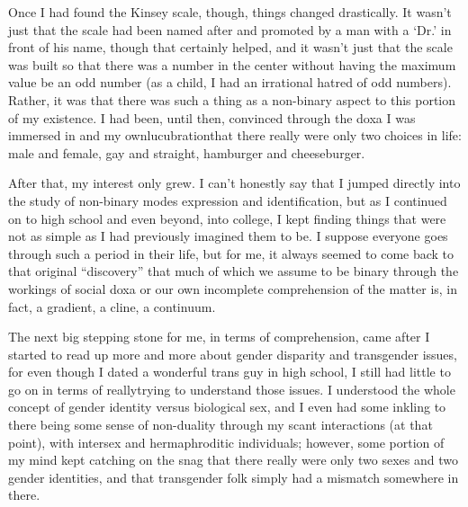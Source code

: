 Once I had found the Kinsey scale, though, things changed drastically. It wasn't just that the scale had been named after and promoted by a man with a `Dr.' in front of his name, though that certainly helped, and it wasn't just that the scale was built so that there was a number in the center without having the maximum value be an odd number (as a child, I had an irrational hatred of odd numbers). Rather, it was that there was such a thing as a non-binary aspect to this portion of my existence. I had been, until then, convinced through the doxa I was immersed in and my ownlucubrationthat there really were only two choices in life: male and female, gay and straight, hamburger and cheeseburger.

After that, my interest only grew. I can't honestly say that I jumped directly into the study of non-binary modes expression and identification, but as I continued on to high school and even beyond, into college, I kept finding things that were not as simple as I had previously imagined them to be. I suppose everyone goes through such a period in their life, but for me, it always seemed to come back to that original ``discovery'' that much of which we assume to be binary through the workings of social doxa or our own incomplete comprehension of the matter is, in fact, a gradient, a cline, a continuum.

The next big stepping stone for me, in terms of comprehension, came after I started to read up more and more about gender disparity and transgender issues, for even though I dated a wonderful trans guy in high school, I still had little to go on in terms of reallytrying to understand those issues. I understood the whole concept of gender identity versus biological sex, and I even had some inkling to there being some sense of non-duality through my scant interactions (at that point), with intersex and hermaphroditic individuals; however, some portion of my mind kept catching on the snag that there really were only two sexes and two gender identities, and that transgender folk simply had a mismatch somewhere in there.

